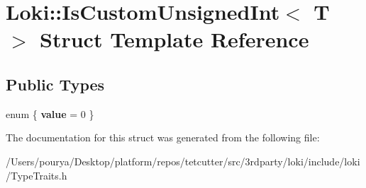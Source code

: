 \hypertarget{structLoki_1_1IsCustomUnsignedInt}{}\section{Loki\+:\+:Is\+Custom\+Unsigned\+Int$<$ T $>$ Struct Template Reference}
\label{structLoki_1_1IsCustomUnsignedInt}
\subsection*{Public Types}
\begin{DoxyCompactItemize}
\item 
\hypertarget{structLoki_1_1IsCustomUnsignedInt_a0df3b174d834f8dc5b547425a59f26f3}{}enum \{ {\bfseries value} = 0
 \}\label{structLoki_1_1IsCustomUnsignedInt_a0df3b174d834f8dc5b547425a59f26f3}

\end{DoxyCompactItemize}


The documentation for this struct was generated from the following file\+:\begin{DoxyCompactItemize}
\item 
/\+Users/pourya/\+Desktop/platform/repos/tetcutter/src/3rdparty/loki/include/loki/Type\+Traits.\+h\end{DoxyCompactItemize}
